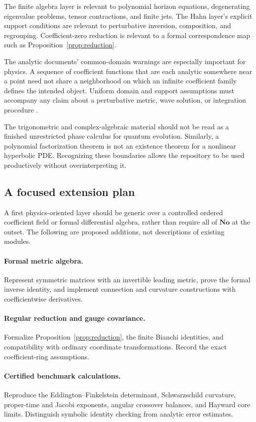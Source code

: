 \documentclass[11pt,letterpaper]{article}
\newcommand{\No}{\mathbf{No}}
\theoremstyle{definition}
\theoremstyle{remark}
\begin{document}
The finite algebra layer is relevant to polynomial horizon equations,
degenerating eigenvalue problems, tensor contractions, and finite jets. The
Hahn layer's explicit support conditions are relevant to perturbative
inversion, composition, and regrouping. Coefficient-zero reduction is relevant
to a formal correspondence map such as Proposition~\ref{prop:reduction}.

The analytic documents' common-domain warnings are especially important for
physics. A sequence of coefficient functions that are each analytic somewhere
near a point need not share a neighborhood on which an infinite coefficient
family defines the intended object. Uniform domain and support assumptions
must accompany any claim about a perturbative metric, wave solution, or
integration procedure \cite{RepoDocs,RepoAnalysis}.

The trigonometric and complex-algebraic material should not be read as a
finished unrestricted phase calculus for quantum evolution. Similarly, a
polynomial factorization theorem is not an existence theorem for a nonlinear
hyperbolic PDE. Recognizing these boundaries allows the repository to be used
productively without overinterpreting it.

\subsection{A focused extension plan}

A first physics-oriented layer should be generic over a controlled ordered
coefficient field or formal differential algebra, rather than require all of
$\No$ at the outset. The following are proposed additions, not descriptions of
existing modules.


\paragraph{Formal metric algebra.}
Represent symmetric matrices with an invertible leading metric, prove the
formal inverse identity, and implement connection and curvature constructions
with coefficientwise derivatives.
\paragraph{Regular reduction and gauge covariance.}
Formalize Proposition~\ref{prop:reduction}, the finite Bianchi identities, and
compatibility with ordinary coordinate transformations. Record the exact
coefficient-ring assumptions.
\paragraph{Certified benchmark calculations.}
Reproduce the Eddington--Finkelstein determinant, Schwarzschild curvature,
proper-time and Jacobi exponents, angular crossover balances, and Hayward core
limits. Distinguish symbolic identity checking from analytic error estimates.
\end{document}
